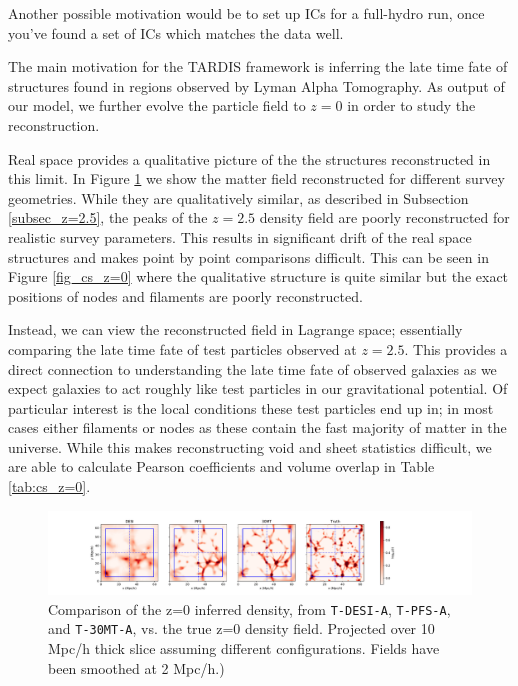 \documentclass[times]{aastex62}
\begin{document}
{\color{red}Another possible motivation would be to set up ICs for a full-hydro run, once you've found a set of ICs which matches the data well.}

The main motivation for the TARDIS framework is inferring the late time fate of structures found in regions observed by Lyman Alpha Tomography. As output of our model, we further evolve the particle field to $z=0$ in order to study the reconstruction. 

Real space provides a qualitative picture of the the structures reconstructed in this limit. In Figure \ref{fig_matter_z=0} we show the matter field reconstructed for different survey geometries. While they are qualitatively similar, as described in Subsection \ref{subsec_z=2.5}, the peaks of the $z=2.5$ density field are poorly reconstructed for realistic survey parameters. This results in significant drift of the real space structures and makes point by point comparisons difficult. This can be seen in Figure \ref{fig_cs_z=0} where the qualitative structure is quite similar but the exact positions of nodes and filaments are poorly reconstructed.

Instead, we can view the reconstructed field in Lagrange space; essentially comparing the late time fate of test particles observed at $z=2.5$. This provides a direct connection to understanding the late time fate of observed galaxies as we expect galaxies to act roughly like test particles in our gravitational potential. Of particular interest is the local conditions these test particles end up in; in most cases either filaments or nodes as these contain the fast majority of matter in the universe. While this makes reconstructing void and sheet statistics difficult, we are able to calculate Pearson coefficients and volume overlap in Table \ref{tab:cs_z=0}.



\begin{figure}
  \centering  \includegraphics[trim=3cm 0cm 0cm 0cm,width=1.2\textwidth]{./figs_treepm/z=0_density.pdf}
    \caption{Comparison of the z=0 inferred density, from \texttt{T-DESI-A}, \texttt{T-PFS-A}, and \texttt{T-30MT-A}, vs. the true z=0 density field. Projected over 10 Mpc/h thick slice assuming different configurations. Fields have been smoothed at 2 Mpc/h.)} 
    \label{fig_matter_z=0}
\end{figure}
\end{document}
